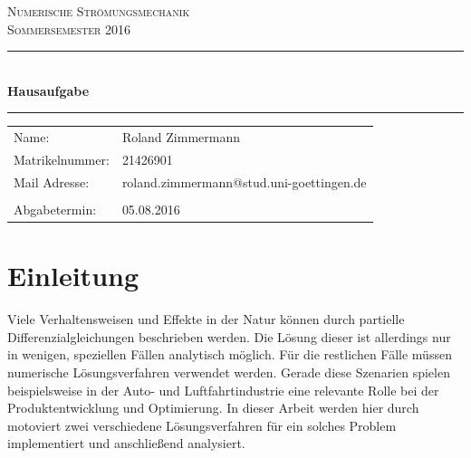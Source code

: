 \documentclass[12pt,a4paper,titlepage,headinclude,bibtotoc]{scrartcl}
\begin{document}
\begin{titlepage}
\centering
\textsc{\Large Numerische Strömungsmechanik\\
[1.5ex] Sommersemester 2016}

\vspace*{4.2cm}

\rule{\textwidth}{1pt}\\[0.5cm]
{\huge \bfseries
  Hausaufgabe\\[1.5ex]}
\rule{\textwidth}{1pt}

\vspace*{3.5cm}

\begin{Large}
\begin{tabular}{ll}
Name: & Roland Zimmermann\\
Matrikelnummer:	& 21426901 \\
Mail Adresse: & roland.zimmermann@stud.uni-goettingen.de \\ 
\\
Abgabetermin: & 05.08.2016\\
\end{tabular}
\end{Large}

\end{titlepage}



\tableofcontents

\newpage

\section{Einleitung}
\label{sec:einleitung}
Viele Verhaltensweisen und Effekte in der Natur können durch partielle Differenzialgleichungen beschrieben werden. Die Lösung dieser ist allerdings nur in wenigen, speziellen Fällen analytisch möglich. Für die restlichen Fälle müssen numerische Lösungsverfahren verwendet werden. Gerade diese Szenarien spielen beispielsweise in der Auto- und Luftfahrtindustrie eine relevante Rolle bei der Produktentwicklung und Optimierung. In dieser Arbeit werden hier durch motoviert zwei verschiedene Lösungsverfahren für ein solches Problem implementiert und anschließend analysiert.
\end{document}
